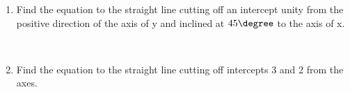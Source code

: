 \renewcommand{\theequation}{\theenumi}
\renewcommand{\thefigure}{\theenumi}
\begin{enumerate}[label=\thesubsection.\arabic*.,ref=\thesubsection.\theenumi]
%
\item Find the equation to the straight line cutting off an intercept unity from the positive direction of the
axis of y and inclined at $45\degree$   to the axis of x.

\\
\solution



\item Find the equation to the straight line cutting off intercepts 3 and 2 from the axes.
%
\\
\solution

\end{enumerate}
